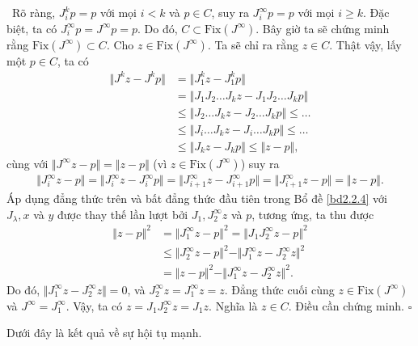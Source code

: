 \documentclass[14pt, oneside,A4paper]{book}
\theoremstyle{plain}
\newcommand{\eproof}{\hfill $\square$}
\newcommand{\chm}{{\bf  Chứng minh.}}
\begin{document}
\noindent \chm \rm \ 
Rõ ràng, $J_{i}^{k}p=p$ với mọi $i<k$ và $p \in C$, suy ra  $J_{i}^{\infty}p=p$ với mọi $i \geq k$. Đặc biệt, ta có $J_{i}^{\infty}p=J^{\infty}p=p$. Do đó, $C\subset \text{Fix} (J^{\infty}).$ Bây giờ ta sẽ chứng minh rằng $\text{Fix}(J^{\infty}) \subset C.$ Cho $z \in \text{Fix}(J^{\infty})$. Ta sẽ chỉ ra rằng $z \in C$. Thật vậy, lấy một  $p \in C$, ta có
\begin{align*}
\Vert J^{k}z - J^{k}p \Vert &= \Vert J_{1}^{k}z - J_{1}^{k}p \Vert \\
&= \Vert J_{1}J_{2}\dots J_{k}z-J_{1}J_{2}\dots J_{k}p \Vert \\
& \leq \Vert J_{2}\dots J_{k}z-J_{2} \dots J_{k}p \Vert \leq \dots \\
& \leq \Vert J_{i}\dots J_{k}z-J_{i} \dots J_{k}p \Vert \leq \dots \\
& \leq \Vert J_{k}z-J_{k}p \Vert \leq \Vert z-p \Vert ,
\end{align*}
cùng với $\Vert J^{\infty}z-p \Vert = \Vert z-p \Vert$ (vì $z \in \text{Fix}(J^{\infty})$) suy ra
\begin{align*}
\Vert J_{i}^{\infty}z -p \Vert = \Vert J_{i}^{\infty}z -J_{i}^{\infty}p \Vert = \Vert J_{i+1}^{\infty}z -J_{i+1}^{\infty}p \Vert = \Vert J_{i+1}^{\infty}z -p \Vert = \Vert z-p \Vert.
\end{align*}
Áp dụng đẳng thức trên và bất đẳng thức đầu tiên trong Bổ đề \ref{bd2.2.4} với $J_{\lambda},x$ và $y$ được thay thế lần lượt bởi $J_{1},J_{2}^{\infty}z$ và $p$, tương ứng, ta thu được
\begin{align*}
\Vert z-p \Vert^{2} &= \Vert J_{1}^{\infty}z -p \Vert^{2} = \Vert J_{1}J_{2}^{\infty}z -p \Vert^{2} \\
& \leq \Vert J_{2}^{\infty}z -p \Vert^{2} - \Vert J_{1}^{\infty}z - J_{2}^{\infty}z \Vert^{2} \\
& = \Vert z-p \Vert^{2} - \Vert J_{1}^{\infty}z - J_{2}^{\infty}z \Vert^{2}.
\end{align*}
Do đó, $\Vert J_{1}^{\infty}z - J_{2}^{\infty}z \Vert = 0$, và $J_{2}^{\infty}z=J_{1}^{\infty}z=z$. Đẳng thức cuối cùng $z \in \text{Fix}(J^{\infty})$ và $J^{\infty} = J_{1}^{\infty}$. Vậy, ta có $z=J_{1}J_{2}^{\infty}z=J_{1}z$. Nghĩa là $z \in C$. Điều cần chứng minh.
\eproof


Dưới đây là kết quả về sự hội tụ mạnh.
\end{document}
